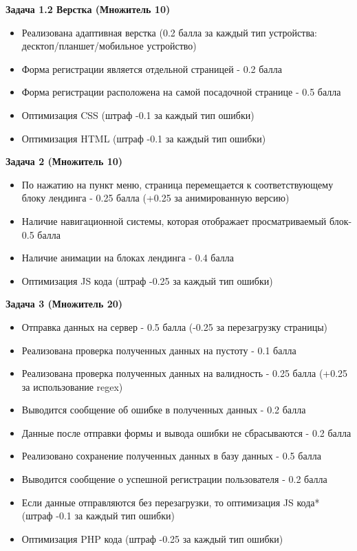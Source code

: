 \textbf{Задача 1.2 Верстка (Множитель 10)}
\begin{itemize}
    \item Реализована адаптивная верстка (0.2 балла за каждый тип устройства: десктоп/планшет/мобильное устройство)
    \item Форма регистрации является отдельной страницей - 0.2 балла
    \item Форма регистрации расположена на самой посадочной странице - 0.5 балла
    \item Оптимизация CSS (штраф -0.1 за каждый тип ошибки)
    \item Оптимизация HTML (штраф -0.1 за каждый тип ошибки)
\end{itemize}

\textbf{Задача 2 (Множитель 10)}
\begin{itemize}
    \item По нажатию на пункт меню, страница перемещается к соответствующему блоку лендинга  - 0.25 балла (+0.25 за анимированную версию)
    \item Наличие навигационной системы, которая отображает просматриваемый блок- 0.5 балла
    \item Наличие анимации на блоках лендинга - 0.4 балла
    \item Оптимизация JS кода (штраф -0.25 за каждый тип ошибки)
\end{itemize}

\textbf{Задача 3 (Множитель 20)}
\begin{itemize}
    \item Отправка данных на сервер - 0.5 балла (-0.25 за перезагрузку страницы)
    \item Реализована проверка полученных данных на пустоту - 0.1 балла
    \item Реализована проверка полученных данных на валидность - 0.25 балла (+0.25 за использование regex)
    \item Выводится сообщение об ошибке в полученных данных - 0.2 балла
    \item Данные после отправки формы и вывода ошибки не сбрасываются - 0.2 балла
    \item Реализовано сохранение полученных данных в базу данных - 0.5 балла
    \item Выводится сообщение о успешной регистрации пользователя - 0.2 балла
    \item Если данные отправляются без перезагрузки, то оптимизация JS кода* (штраф -0.1 за каждый тип ошибки)
    \item Оптимизация PHP кода  (штраф -0.25 за каждый тип ошибки)
\end{itemize}

